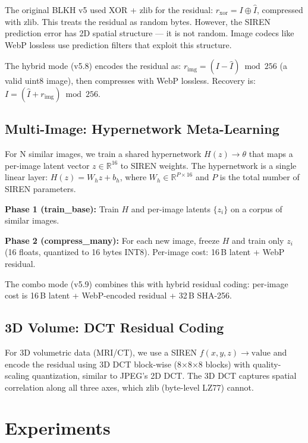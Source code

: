 \documentclass[11pt,a4paper]{article}
\begin{document}
The original BLKH v5 used XOR + zlib for the residual: $r_{\text{xor}} = I \oplus \hat{I}$, compressed with zlib. This treats the residual as random bytes. However, the SIREN prediction error has 2D spatial structure --- it is not random. Image codecs like WebP lossless use prediction filters that exploit this structure.

The hybrid mode (v5.8) encodes the residual as: $r_{\text{img}} = (I - \hat{I}) \bmod 256$ (a valid uint8 image), then compresses with WebP lossless. Recovery is: $I = (\hat{I} + r_{\text{img}}) \bmod 256$.

\subsection{Multi-Image: Hypernetwork Meta-Learning}

For N similar images, we train a shared hypernetwork $H(z) \to \theta$ that maps a per-image latent vector $z \in \mathbb{R}^{16}$ to SIREN weights. The hypernetwork is a single linear layer: $H(z) = W_h z + b_h$, where $W_h \in \mathbb{R}^{P \times 16}$ and $P$ is the total number of SIREN parameters.

\textbf{Phase 1 (train\_base):} Train $H$ and per-image latents $\{z_i\}$ on a corpus of similar images.

\textbf{Phase 2 (compress\_many):} For each new image, freeze $H$ and train only $z_i$ (16 floats, quantized to 16 bytes INT8). Per-image cost: 16\,B latent + WebP residual.

The combo mode (v5.9) combines this with hybrid residual coding: per-image cost is 16\,B latent + WebP-encoded residual + 32\,B SHA-256.

\subsection{3D Volume: DCT Residual Coding}

For 3D volumetric data (MRI/CT), we use a SIREN $f(x, y, z) \to \text{value}$ and encode the residual using 3D DCT block-wise (8$\times$8$\times$8 blocks) with quality-scaling quantization, similar to JPEG's 2D DCT. The 3D DCT captures spatial correlation along all three axes, which zlib (byte-level LZ77) cannot.

\section{Experiments}
\end{document}
